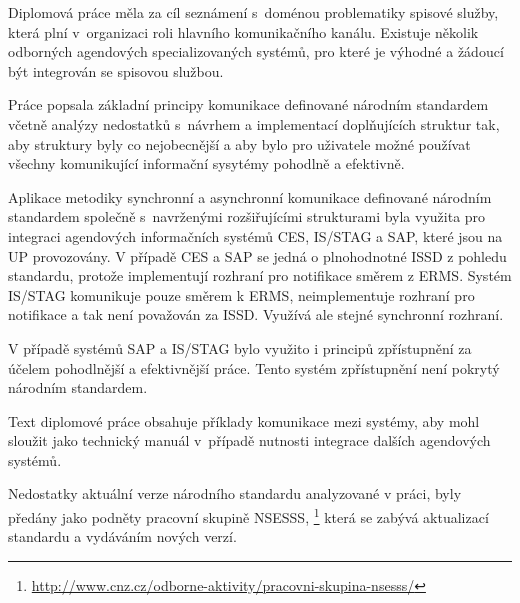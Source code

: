 \documentclass[
  master,
  field=ainfp,
  biblatex,
  language=czech,
  glossaries,
  theorems=false,
  index
]{kidiplom}
\begin{document}
\begin{kiconclusions}
Diplomová práce měla za cíl seznámení s~doménou problematiky spisové služby, která plní v~organizaci roli hlavního komunikačního kanálu. Existuje několik odborných agendových specializovaných systémů, pro které je výhodné a žádoucí být integrován se spisovou službou. 

Práce popsala základní principy komunikace definované národním standardem včetně analýzy nedostatků s~návrhem a implementací doplňujících struktur tak, aby struktury byly co nejobecnější a aby bylo pro uživatele možné používat všechny komunikující informační sysytémy pohodlně a efektivně. 

Aplikace metodiky synchronní a asynchronní komunikace definované národním standardem společně s~navrženými rozšiřujícími strukturami byla využita pro integraci agendových informačních systémů CES, IS/STAG a SAP, které jsou na UP provozovány. V případě CES a SAP se jedná o plnohodnotné ISSD z pohledu standardu, protože implementují rozhraní pro notifikace směrem z ERMS. Systém IS/STAG komunikuje pouze směrem k ERMS, neimplementuje rozhraní pro notifikace a tak není považován za ISSD. Využívá ale stejné synchronní rozhraní.

V případě systémů SAP a IS/STAG bylo využito i principů zpřístupnění za účelem pohodlnější a efektivnější práce. Tento systém zpřístupnění není pokrytý národním standardem.

Text diplomové práce obsahuje příklady komunikace mezi systémy, aby mohl sloužit jako technický manuál v~případě nutnosti integrace dalších agendových systémů.

Nedostatky aktuální verze národního standardu analyzované v práci, byly předány jako podněty pracovní skupině NSESSS, \footnote{\url{http://www.cnz.cz/odborne-aktivity/pracovni-skupina-nsesss/}} která se zabývá aktualizací standardu a vydáváním nových verzí.
\end{kiconclusions}
\end{document}
